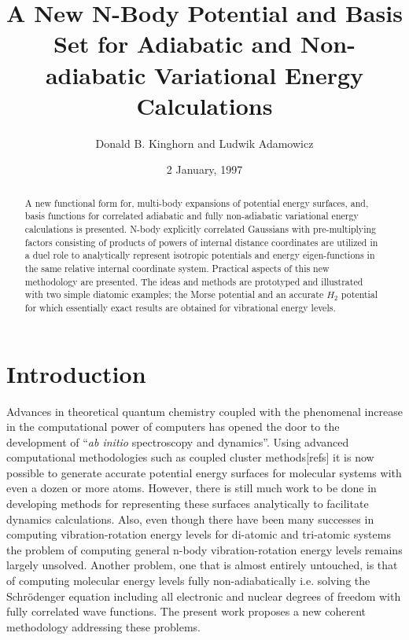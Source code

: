 \documentclass[12pt,thmsa]{article}
\begin{document}
\author{Donald B. Kinghorn and Ludwik Adamowicz}
\title{A New N-Body Potential and Basis Set for Adiabatic and Non-adiabatic
Variational Energy Calculations }
\date{2 January, 1997 }
\maketitle

\begin{abstract}
A new functional form for, multi-body expansions of potential energy
surfaces, and, basis functions for correlated adiabatic and fully
non-adiabatic  variational energy calculations is presented. N-body
explicitly correlated Gaussians with pre-multiplying factors consisting of
products of powers of internal distance coordinates are utilized in a duel
role to analytically represent isotropic potentials and energy
eigen-functions in the same relative internal coordinate system. Practical
aspects of this new methodology are presented. The ideas and methods are
prototyped and illustrated with two simple diatomic examples; the Morse
potential and an accurate $H_2$ potential for which essentially exact
results are obtained for vibrational energy levels. 
\end{abstract}

\section{Introduction}

Advances in theoretical quantum chemistry coupled with the phenomenal
increase in the computational power of computers has opened the door to the
development of ``\emph{ab initio} spectroscopy and dynamics''. Using
advanced computational methodologies such as coupled cluster methods[refs]
it is now possible to generate accurate potential energy surfaces for
molecular systems with even a dozen or more atoms. However, there is still
much work to be done in developing methods for representing these surfaces
analytically to facilitate dynamics calculations. Also, even though there
have been many successes in computing vibration-rotation energy levels for
di-atomic and tri-atomic systems the problem of computing general n-body
vibration-rotation energy levels remains largely unsolved. Another problem,
one that is almost entirely untouched, is that of computing molecular energy
levels fully non-adiabatically i.e. solving the Schr\"{o}denger equation
including all electronic and nuclear degrees of freedom with fully
correlated wave functions. The present work proposes a new coherent
methodology addressing these problems.
\end{document}
